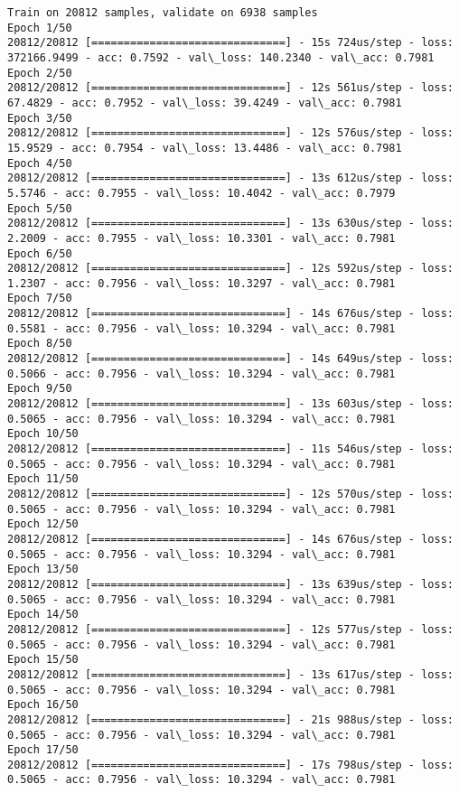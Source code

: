 \documentclass[11pt]{article}
\begin{document}
    \begin{Verbatim}[commandchars=\\\{\}]
Train on 20812 samples, validate on 6938 samples
Epoch 1/50
20812/20812 [==============================] - 15s 724us/step - loss: 372166.9499 - acc: 0.7592 - val\_loss: 140.2340 - val\_acc: 0.7981
Epoch 2/50
20812/20812 [==============================] - 12s 561us/step - loss: 67.4829 - acc: 0.7952 - val\_loss: 39.4249 - val\_acc: 0.7981
Epoch 3/50
20812/20812 [==============================] - 12s 576us/step - loss: 15.9529 - acc: 0.7954 - val\_loss: 13.4486 - val\_acc: 0.7981
Epoch 4/50
20812/20812 [==============================] - 13s 612us/step - loss: 5.5746 - acc: 0.7955 - val\_loss: 10.4042 - val\_acc: 0.7979
Epoch 5/50
20812/20812 [==============================] - 13s 630us/step - loss: 2.2009 - acc: 0.7955 - val\_loss: 10.3301 - val\_acc: 0.7981
Epoch 6/50
20812/20812 [==============================] - 12s 592us/step - loss: 1.2307 - acc: 0.7956 - val\_loss: 10.3297 - val\_acc: 0.7981
Epoch 7/50
20812/20812 [==============================] - 14s 676us/step - loss: 0.5581 - acc: 0.7956 - val\_loss: 10.3294 - val\_acc: 0.7981
Epoch 8/50
20812/20812 [==============================] - 14s 649us/step - loss: 0.5066 - acc: 0.7956 - val\_loss: 10.3294 - val\_acc: 0.7981
Epoch 9/50
20812/20812 [==============================] - 13s 603us/step - loss: 0.5065 - acc: 0.7956 - val\_loss: 10.3294 - val\_acc: 0.7981
Epoch 10/50
20812/20812 [==============================] - 11s 546us/step - loss: 0.5065 - acc: 0.7956 - val\_loss: 10.3294 - val\_acc: 0.7981
Epoch 11/50
20812/20812 [==============================] - 12s 570us/step - loss: 0.5065 - acc: 0.7956 - val\_loss: 10.3294 - val\_acc: 0.7981
Epoch 12/50
20812/20812 [==============================] - 14s 676us/step - loss: 0.5065 - acc: 0.7956 - val\_loss: 10.3294 - val\_acc: 0.7981
Epoch 13/50
20812/20812 [==============================] - 13s 639us/step - loss: 0.5065 - acc: 0.7956 - val\_loss: 10.3294 - val\_acc: 0.7981
Epoch 14/50
20812/20812 [==============================] - 12s 577us/step - loss: 0.5065 - acc: 0.7956 - val\_loss: 10.3294 - val\_acc: 0.7981
Epoch 15/50
20812/20812 [==============================] - 13s 617us/step - loss: 0.5065 - acc: 0.7956 - val\_loss: 10.3294 - val\_acc: 0.7981
Epoch 16/50
20812/20812 [==============================] - 21s 988us/step - loss: 0.5065 - acc: 0.7956 - val\_loss: 10.3294 - val\_acc: 0.7981
Epoch 17/50
20812/20812 [==============================] - 17s 798us/step - loss: 0.5065 - acc: 0.7956 - val\_loss: 10.3294 - val\_acc: 0.7981

\end{Verbatim}
\end{document}
